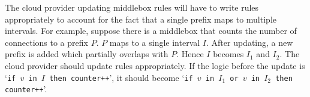 The cloud provider updating middlebox rules will have to write rules appropriately to account for the fact that a 
single prefix maps to multiple intervals. For example, suppose there is a middlebox that counts the number 
of connections to a prefix $P$. $P$ maps to a single interval $I$. After updating, a new prefix is added 
which  partially overlaps with $P$. Hence $I$ becomes $I_1$ and $I_2$. The cloud provider should update 
rules appropriately. If the logic before the update is `\texttt{if $v$ in $I$ then counter++}',
it should become `\texttt{if $v$ in $I_1$ or $v$ in $I_2$ then counter++}'.












